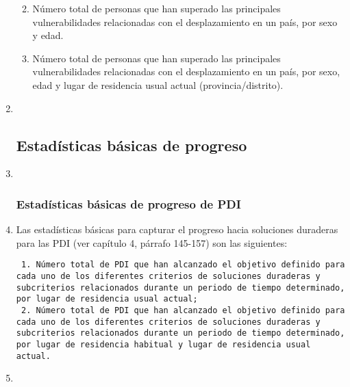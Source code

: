 \documentclass[
]{book}
\providecommand{\tightlist}{%
  \setlength{\itemsep}{0pt}\setlength{\parskip}{0pt}}
\begin{document}
\begin{enumerate}
  \begin{enumerate}
  \def\labelenumii{\arabic{enumii}.}
  \tightlist
  \item
    Número total de personas que han superado las principales vulnerabilidades relacionadas con el desplazamiento en un país, por sexo y edad.
  \item
    Número total de personas que han superado las principales vulnerabilidades relacionadas con el desplazamiento en un país, por sexo, edad y lugar de residencia usual actual (provincia/distrito).
  \end{enumerate}
\item ~
  \hypertarget{estaduxedsticas-buxe1sicas-de-progreso}{%
  \subsection{Estadísticas básicas de progreso}\label{estaduxedsticas-buxe1sicas-de-progreso}}
\item ~
  \hypertarget{estaduxedsticas-buxe1sicas-de-progreso-de-pdi}{%
  \subsubsection{Estadísticas básicas de progreso de PDI}\label{estaduxedsticas-buxe1sicas-de-progreso-de-pdi}}
\item
  Las estadísticas básicas para capturar el progreso hacia soluciones duraderas para las PDI (ver capítulo 4, párrafo 145-157) son las siguientes:

\begin{verbatim}
 1. Número total de PDI que han alcanzado el objetivo definido para cada uno de los diferentes criterios de soluciones duraderas y subcriterios relacionados durante un periodo de tiempo determinado, por lugar de residencia usual actual;
 2. Número total de PDI que han alcanzado el objetivo definido para cada uno de los diferentes criterios de soluciones duraderas y subcriterios relacionados durante un periodo de tiempo determinado, por lugar de residencia habitual y lugar de residencia usual actual.
\end{verbatim}
\item ~
  \hypertarget{estaduxedsticas-buxe1sicas-de-progreso-de-las-poblaciones-relacionadas-con-las-pdi-y-las-personas-que-han-superado-las-principales-vulnerabilidades-relacionadas-con-el-desplazamiento}{%
}
\end{enumerate}
\end{document}
